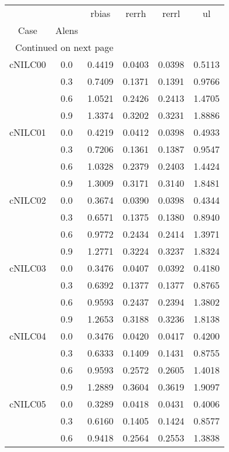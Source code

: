 \begin{longtable}{cccccc}
\toprule
        &     &  rbias &   rerrh &  rerrl &      ul \\
Case & Alens &        &         &        &         \\
\midrule
\endhead
\midrule
\multicolumn{3}{r}{{Continued on next page}} \\
\midrule
\endfoot

\bottomrule
\endlastfoot
cNILC00 & 0.0 & 0.4419 & 0.0403 & 0.0398 & 0.5113 \\
        & 0.3 & 0.7409 & 0.1371 & 0.1391 & 0.9766 \\
        & 0.6 & 1.0521 & 0.2426 & 0.2413 & 1.4705 \\
        & 0.9 & 1.3374 & 0.3202 & 0.3231 & 1.8886 \\
cNILC01 & 0.0 & 0.4219 & 0.0412 & 0.0398 & 0.4933 \\
        & 0.3 & 0.7206 & 0.1361 & 0.1387 & 0.9547 \\
        & 0.6 & 1.0328 & 0.2379 & 0.2403 & 1.4424 \\
        & 0.9 & 1.3009 & 0.3171 & 0.3140 & 1.8481 \\
cNILC02 & 0.0 & 0.3674 & 0.0390 & 0.0398 & 0.4344 \\
        & 0.3 & 0.6571 & 0.1375 & 0.1380 & 0.8940 \\
        & 0.6 & 0.9772 & 0.2434 & 0.2414 & 1.3971 \\
        & 0.9 & 1.2771 & 0.3224 & 0.3237 & 1.8324 \\
cNILC03 & 0.0 & 0.3476 & 0.0407 & 0.0392 & 0.4180 \\
        & 0.3 & 0.6392 & 0.1377 & 0.1377 & 0.8765 \\
        & 0.6 & 0.9593 & 0.2437 & 0.2394 & 1.3802 \\
        & 0.9 & 1.2653 & 0.3188 & 0.3236 & 1.8138 \\
cNILC04 & 0.0 & 0.3476 & 0.0420 & 0.0417 & 0.4200 \\
        & 0.3 & 0.6333 & 0.1409 & 0.1431 & 0.8755 \\
        & 0.6 & 0.9593 & 0.2572 & 0.2605 & 1.4018 \\
        & 0.9 & 1.2889 & 0.3604 & 0.3619 & 1.9097 \\
cNILC05 & 0.0 & 0.3289 & 0.0418 & 0.0431 & 0.4006 \\
        & 0.3 & 0.6160 & 0.1405 & 0.1424 & 0.8577 \\
        & 0.6 & 0.9418 & 0.2564 & 0.2553 & 1.3838 \\

\end{longtable}
